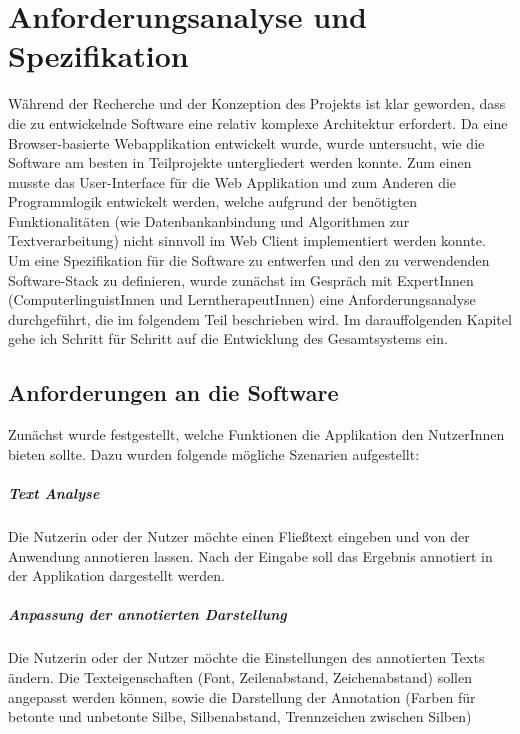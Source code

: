 
\chapter{Anforderungsanalyse und Spezifikation}
\label{sec:specification}

Während der Recherche und der Konzeption des Projekts ist klar geworden, dass die zu entwickelnde Software eine relativ komplexe Architektur erfordert. Da eine Browser-basierte Webapplikation entwickelt wurde, wurde untersucht, wie die Software am besten in Teilprojekte untergliedert werden konnte. Zum einen musste das User-Interface für die Web Applikation und zum Anderen die Programmlogik entwickelt werden, welche aufgrund der benötigten Funktionalitäten (wie Datenbankanbindung und Algorithmen zur Textverarbeitung) nicht sinnvoll im Web Client implementiert werden konnte.\\
Um eine Spezifikation für die Software zu entwerfen und den zu verwendenden Software-Stack zu definieren, wurde zunächst im Gespräch mit ExpertInnen (ComputerlinguistInnen und LerntherapeutInnen) eine Anforderungsanalyse durchgeführt, die im folgendem Teil beschrieben wird. Im darauffolgenden Kapitel gehe ich Schritt für Schritt auf die Entwicklung des Gesamtsystems ein.

\section{Anforderungen an die Software}

Zunächst wurde festgestellt, welche Funktionen die Applikation den NutzerInnen bieten sollte. Dazu wurden folgende mögliche Szenarien aufgestellt:

\paragraph{Text Analyse} 
Die Nutzerin oder der Nutzer möchte einen Fließtext eingeben und von der Anwendung annotieren lassen. Nach der Eingabe soll das Ergebnis annotiert in der Applikation dargestellt werden.

\paragraph{Anpassung der annotierten Darstellung}
Die Nutzerin oder der Nutzer möchte die Einstellungen des annotierten Texts ändern. Die Texteigenschaften (Font, Zeilenabstand, Zeichenabstand) sollen angepasst werden können, sowie die Darstellung der Annotation (Farben für betonte und unbetonte Silbe, Silbenabstand, Trennzeichen zwischen Silben)

